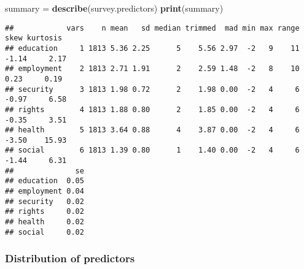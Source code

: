 \documentclass[
]{article}
\newenvironment{Shaded}{\begin{snugshade}}{\end{snugshade}}
\newcommand{\AttributeTok}[1]{\textcolor[rgb]{0.13,0.29,0.53}{#1}}
\newcommand{\FunctionTok}[1]{\textcolor[rgb]{0.13,0.29,0.53}{\textbf{#1}}}
\newcommand{\NormalTok}[1]{#1}
\newcommand{\OtherTok}[1]{\textcolor[rgb]{0.56,0.35,0.01}{#1}}
\newcommand{\SpecialCharTok}[1]{\textcolor[rgb]{0.81,0.36,0.00}{\textbf{#1}}}
\begin{document}
\begin{Shaded}
\end{Shaded}

\begin{Shaded}
\begin{Highlighting}[]
\NormalTok{summary }\OtherTok{=} \FunctionTok{describe}\NormalTok{(survey.predictors)}
\FunctionTok{print}\NormalTok{(summary)}
\end{Highlighting}
\end{Shaded}

\begin{verbatim}
##            vars    n mean   sd median trimmed  mad min max range  skew kurtosis
## education     1 1813 5.36 2.25      5    5.56 2.97  -2   9    11 -1.14     2.17
## employment    2 1813 2.71 1.91      2    2.59 1.48  -2   8    10  0.23     0.19
## security      3 1813 1.98 0.72      2    1.98 0.00  -2   4     6 -0.97     6.58
## rights        4 1813 1.88 0.80      2    1.85 0.00  -2   4     6 -0.35     3.51
## health        5 1813 3.64 0.88      4    3.87 0.00  -2   4     6 -3.50    15.93
## social        6 1813 1.39 0.80      1    1.40 0.00  -2   4     6 -1.44     6.31
##              se
## education  0.05
## employment 0.04
## security   0.02
## rights     0.02
## health     0.02
## social     0.02
\end{verbatim}

\hypertarget{distribution-of-predictors}{%
\subsubsection{Distribution of
predictors}\label{distribution-of-predictors}}
\end{document}
